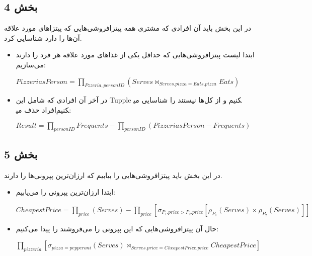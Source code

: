 \subsection*{بخش 4}
در این بخش باید آن افرادی که مشتری همه پیتزافروشی‌هایی که پیتزاهای مورد علاقه آن‌ها را دارد شناسایی کرد.
\begin{itemize}	
	\item
	ابتدا لیست پیتزافروشی‌هایی که حداقل یکی از غذاهای مورد علاقه هر فرد را دارند می‌سازیم:
	
\setLTR
$PizzeriasPerson =\prod_{Pzzeria,personID} (Serves \bowtie_{Serves.pizza =Eats.pizza}Eats)$
\setRTL

	\item 
	در آخر آن افرادی که شامل این Tupple ها نیستند را شناسایی می‎کنیم و از کل افراد حذف می‎کنیم:
	
	\setLTR
	
	$Result = \prod_{personID}Frequents - \prod_{personID}(PizzeriasPerson - Frequents)$
	

	\setRTL
\end{itemize}


\subsection*{بخش 5}
در این بخش باید پیتزافروشی‌هایی را بیابیم که ارزان‌ترین پپرونی‌ها را دارند.
\begin{itemize}
	\item ابتدا ارزان‌ترین پپرونی را می‌یابیم:
	
	\setLTR
	$CheapestPrice = \prod_{price}(Serves) - \prod_{price}[\sigma_{P_1.price>P_2.price}[\rho_{P_1}(Serves)\times\rho_{P_2}(Serves)]]$
	\setRTL
	
	\item حال آن پیتزافروشی‌هایی که این پپرونی را می‌فروشند را پیدا می‌کنیم:
	
	\setLTR
	
	$\prod_{pizzeria}[\sigma_{pizza=pepperoni}(Serves)\bowtie_{Serves.price = CheapestPrice.price}CheapestPrice]$
	\setRTL
\end{itemize}